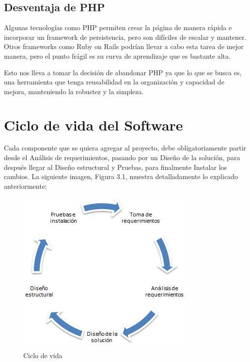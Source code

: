 \documentclass[a4paper,12pt,openany,oneside]{book}
\begin{document}
\subsection{Desventaja de PHP}
Algunas tecnologías como PHP permiten crear la página de manera rápida e incorporar un framework de persistencia, pero son difíciles de escalar y mantener. Otros frameworks como Ruby on Rails podrían llevar a cabo esta tarea de mejor manera, pero el punto frágil es su curva de aprendizaje que es bastante alta.

Esto nos lleva a tomar la decisión de abandonar PHP ya que lo que se busca es, una herramienta que tenga reusabilidad en la organización y capacidad de mejora, manteniendo la robustez y la simpleza.
\section{Ciclo de vida del Software}

Cada componente que se quiera agregar al proyecto, debe obligatoriamente partir desde el Análisis de requerimientos, pasando por un Diseño de la solución, para después llegar al Diseño estructural y Pruebas, para finalmente Instalar los cambios. La siguiente imagen, Figura 3.1, muestra detalladamente lo explicado anteriormente:

\begin{figure}[!hbp]
\begin{center}
\includegraphics[scale=0.6,angle=0]{images/cicloMini.PNG}
\caption{Ciclo de vida}
\label{Organigrama de rectoria}
\end{center}
\end{figure}
\end{document}
